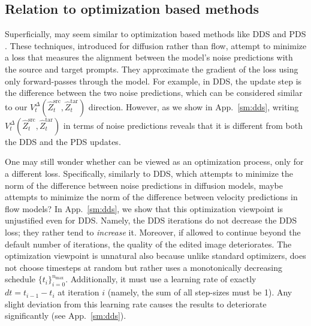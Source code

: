 \subsection{Relation to optimization based methods}
\label{subsec:relation_optim}
Superficially, \ours{} may seem similar to optimization based methods like DDS \cite{hertz2023delta} and PDS \cite{koo2024posterior}. These techniques, introduced for diffusion rather than flow, attempt to minimize a loss that measures the alignment between the model's noise predictions with the source and target prompts. They approximate the gradient of the loss using only forward-passes through the model. For example, in DDS, the update step is the difference between the two noise predictions, which can be considered similar to our $V^\Delta_t(\hat{Z}^{\text{src}}_{t},\hat{Z}^{\text{tar}}_t)$ direction. However, as we show in App.~\ref{sm:dds}, writing $V^\Delta_t(\hat{Z}^{\text{src}}_{t},\hat{Z}^{\text{tar}}_t)$ in terms of noise predictions reveals that it is different from both the DDS and the PDS updates.

One may still wonder whether \ours{} can be viewed as an optimization process, only for a different loss. Specifically, similarly to DDS, which attempts to minimize the norm of the difference between noise predictions in diffusion models, maybe \ours{} attempts to minimize the norm of the difference between velocity predictions in flow models? In App.~\ref{sm:dds}, we show that this optimization viewpoint is unjustified even for DDS. 
Namely, the DDS iterations do not decrease the DDS loss; they rather tend to \emph{increase} it. Moreover, if allowed to continue beyond the default number of iterations, the quality of the edited image deteriorates. The optimization viewpoint is unnatural also because unlike standard optimizers, \ours{} does not choose timesteps at random but rather uses a monotonically decreasing schedule $\{t_i\}^{n_{\max}}_{i=0}$. Additionally, it must use a learning rate of exactly $dt=t_{i-1}-t_{i}$ at iteration $i$ (namely, the sum of all step-sizes must be 1). Any slight deviation from this learning rate causes the results to deteriorate significantly (see App.~\ref{sm:dds}).

